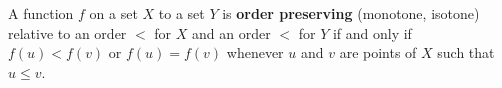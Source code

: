 A function $f$ on a set $X$ to a set $Y$ is \textbf{order preserving} (monotone, isotone) relative to an order $<$ for $X$ and an order $<$ for $Y$ if and only if $f(u) < f(v)$ or $f(u) = f(v)$ whenever $u$ and $v$ are points of $X$ such that $u \leq v$.
